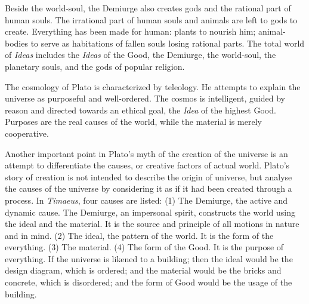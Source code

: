 \documentclass[11pt]{article}
\begin{document}
\newline

Beside the world-soul, the Demiurge also creates gods and the rational part of human souls. 
The irrational part of human souls and animals are left to gods to create. 
Everything has been made for human: 
plants to nourish him; 
animal-bodies to serve as habitations of fallen souls losing rational parts. 
The total world of \textit{Ideas} includes the \textit{Ideas} of the Good, the Demiurge, the world-soul, the planetary souls, and the gods of popular religion.

\newline

The cosmology of Plato is characterized by teleology. 
He attempts to explain the universe as purposeful and well-ordered. 
The cosmos is intelligent, guided by reason and directed towards an ethical goal, the \textit{Idea} of the highest Good. 
Purposes are the real causes of the world, while the material is merely cooperative.

\newline

Another important point in Plato’s myth of the creation of the universe is an attempt to differentiate the causes, or creative factors of actual world. 
Plato’s story of creation is not intended to describe the origin of universe, but analyse the causes of the universe by considering it as if it had been created through a process. 
In \textit{Timaeus}, four causes are listed: 
(1) The Demiurge, the active and dynamic cause. The Demiurge, an impersonal spirit, constructs the world using the ideal and the material. 
It is the source and principle of all motions in nature and in mind. 
(2) The ideal, the pattern of the world. 
It is the form of the everything. 
(3) The material. 
(4) The form of the Good. 
It is the purpose of everything. 
If the universe is likened to a building; 
then the ideal would be the design diagram, which is ordered; 
and the material would be the bricks and concrete, which is disordered; 
and the form of Good would be the usage of the building. 
  
\end{document}
